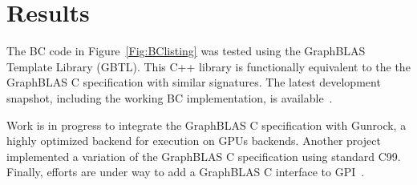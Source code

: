\section{Results}
\label{sec:results}

The BC code in Figure~\ref{Fig:BClisting} 
was tested using the GraphBLAS Template Library (GBTL)\cite{gbtl-cuda16}. This 
C++ library is functionally equivalent to the the GraphBLAS C
specification with similar signatures.  The latest development snapshot, 
including the working BC implementation, is available~\cite{gbtl-github}. 

Work is in progress to integrate the GraphBLAS C specification 
with Gunrock\cite{topc17}, a highly optimized backend for execution 
on GPUs backends.  Another project~\cite{cook} implemented a variation
of the GraphBLAS C specification using standard C99.
Finally, efforts are under way to add a GraphBLAS C interface to GPI~\cite{gpi2016}.

